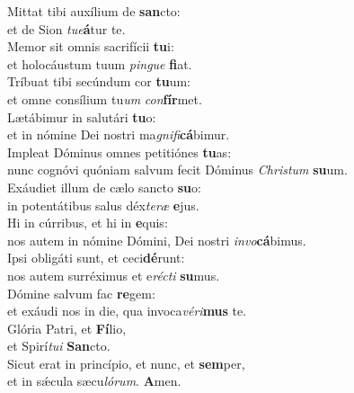 \evenverse Mittat tibi auxílium de \textbf{san}cto:~\*\\
\evenverse et de Sion \textit{tu}\textit{e}\textbf{á}tur te.\\
\oddverse Memor sit omnis sacrifícii \textbf{tu}i:~\*\\
\oddverse et holocáustum tuum \textit{pin}\textit{gue} \textbf{fi}at.\\
\evenverse Tríbuat tibi secúndum cor \textbf{tu}um:~\*\\
\evenverse et omne consílium tu\textit{um} \textit{con}\textbf{fír}met.\\
\oddverse Lætábimur in salutári \textbf{tu}o:~\*\\
\oddverse et in nómine Dei nostri ma\textit{gni}\textit{fi}\textbf{cá}bimur.\\
\evenverse Impleat Dóminus omnes petitiónes \textbf{tu}as:~\*\\
\evenverse nunc cognóvi quóniam salvum fecit Dóminus \textit{Chri}\textit{stum} \textbf{su}um.\\
\oddverse Exáudiet illum de cælo sancto \textbf{su}o:~\*\\
\oddverse in potentátibus salus déx\textit{te}\textit{ræ} \textbf{e}jus.\\
\evenverse Hi in cúrribus, et hi in \textbf{e}quis:~\*\\
\evenverse nos autem in nómine Dómini, Dei nostri \textit{in}\textit{vo}\textbf{cá}bimus.\\
\oddverse Ipsi obligáti sunt, et ceci\textbf{dé}runt:~\*\\
\oddverse nos autem surréximus et e\textit{ré}\textit{cti} \textbf{su}mus.\\
\evenverse Dómine salvum fac \textbf{re}gem:~\*\\
\evenverse et exáudi nos in die, qua invoca\textit{vé}\textit{ri}\textbf{mus} te.\\
\oddverse Glória Patri, et \textbf{Fí}lio,~\*\\
\oddverse et Spirí\textit{tu}\textit{i} \textbf{San}cto.\\
\evenverse Sicut erat in princípio, et nunc, et \textbf{sem}per,~\*\\
\evenverse et in sǽcula sæcu\textit{ló}\textit{rum}. \textbf{A}men.\\
